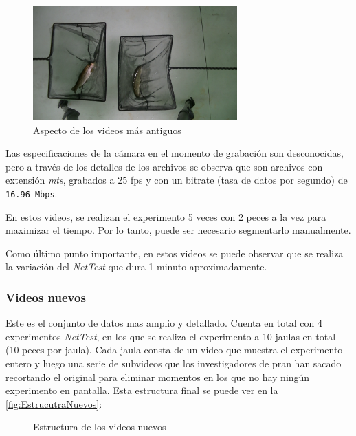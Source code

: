 \begin{figure}[h]
    \centering
    \includegraphics[width=0.70\textwidth]{images/3/ExperimentoAntiguo.png}
    \caption{Aspecto de los videos más antiguos}
    \label{fig:ExperimentoAntiguo}
\end{figure}

Las especificaciones de la cámara en el momento de grabación son desconocidas, pero a través de los detalles de los archivos se observa que son archivos con extensión 
\textit{\acrfull{mts}}, grabados a 25 \acrshort{fps} y con un bitrate (tasa de datos por segundo) de \texttt{16.96 Mbps}.

En estos videos, se realizan el experimento 5 veces con 2 peces a la vez para maximizar el tiempo. Por lo tanto, puede ser necesario segmentarlo manualmente.

Como último punto importante, en estos videos se puede observar que se realiza la variación del \textit{NetTest} que dura 1 minuto aproximadamente.

\subsubsection{Videos nuevos}

Este es el conjunto de datos mas amplio y detallado. Cuenta en total con 4 experimentos \textit{NetTest}, en los que se realiza el experimento a 10 jaulas en total (10 peces por jaula). 
Cada jaula consta de un  video que muestra el experimento entero y luego una serie de subvideos que los investigadores de \acrshort{pran} han sacado recortando el original para eliminar 
momentos en los que no hay ningún experimento en pantalla. Esta estructura final se puede ver en la \autoref{fig:EstrucutraNuevos}:

\begin{figure}[h]
    \centering
    \begin{subfigure}[b]{0.7\textwidth}
    \end{subfigure}
    \caption{Estructura de los  videos nuevos}
    \label{fig:EstrucutraNuevos}
\end{figure}

